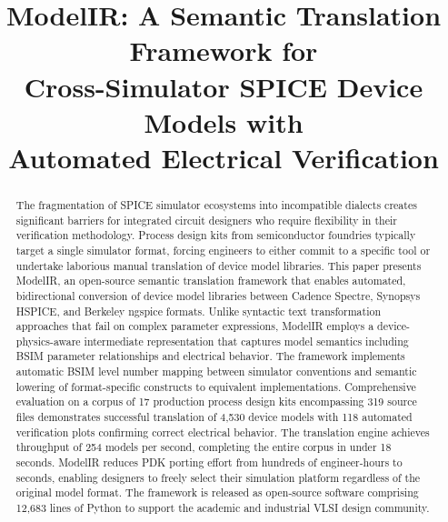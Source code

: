\documentclass[conference]{IEEEtran}
\begin{document}
\title{ModelIR: A Semantic Translation Framework for \\Cross-Simulator SPICE Device Models with\\Automated Electrical Verification}

\author{
}

\maketitle

\begin{abstract}
The fragmentation of SPICE simulator ecosystems into incompatible dialects creates significant barriers for integrated circuit designers who require flexibility in their verification methodology. Process design kits from semiconductor foundries typically target a single simulator format, forcing engineers to either commit to a specific tool or undertake laborious manual translation of device model libraries. This paper presents ModelIR, an open-source semantic translation framework that enables automated, bidirectional conversion of device model libraries between Cadence Spectre, Synopsys HSPICE, and Berkeley ngspice formats. Unlike syntactic text transformation approaches that fail on complex parameter expressions, ModelIR employs a device-physics-aware intermediate representation that captures model semantics including BSIM parameter relationships and electrical behavior. The framework implements automatic BSIM level number mapping between simulator conventions and semantic lowering of format-specific constructs to equivalent implementations. Comprehensive evaluation on a corpus of 17 production process design kits encompassing 319 source files demonstrates successful translation of 4,530 device models with 118 automated verification plots confirming correct electrical behavior. The translation engine achieves throughput of 254 models per second, completing the entire corpus in under 18 seconds. ModelIR reduces PDK porting effort from hundreds of engineer-hours to seconds, enabling designers to freely select their simulation platform regardless of the original model format. The framework is released as open-source software comprising 12,683 lines of Python to support the academic and industrial VLSI design community.
\end{abstract}
\end{document}
